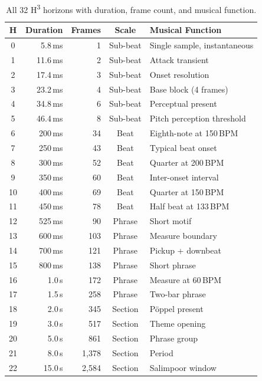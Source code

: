 \documentclass[10pt,twocolumn]{article}
\newcommand{\Htri}{H\textsuperscript{3}}
\begin{document}
\begin{table}[H]
\centering
\caption{All 32 \Htri{} horizons with duration, frame count, and musical function.}
\small
\begin{tabular}{@{}crrcl@{}}
\toprule
\textbf{H} & \textbf{Duration} & \textbf{Frames} & \textbf{Scale} & \textbf{Musical Function} \\
\midrule
0  & 5.8\,ms   & 1     & Sub-beat & Single sample, instantaneous \\
1  & 11.6\,ms  & 2     & Sub-beat & Attack transient \\
2  & 17.4\,ms  & 3     & Sub-beat & Onset resolution \\
3  & 23.2\,ms  & 4     & Sub-beat & Base block (4 frames) \\
4  & 34.8\,ms  & 6     & Sub-beat & Perceptual present \\
5  & 46.4\,ms  & 8     & Sub-beat & Pitch perception threshold \\
\midrule
6  & 200\,ms   & 34    & Beat & Eighth-note at 150\,BPM \\
7  & 250\,ms   & 43    & Beat & Typical beat onset \\
8  & 300\,ms   & 52    & Beat & Quarter at 200\,BPM \\
9  & 350\,ms   & 60    & Beat & Inter-onset interval \\
10 & 400\,ms   & 69    & Beat & Quarter at 150\,BPM \\
11 & 450\,ms   & 78    & Beat & Half beat at 133\,BPM \\
\midrule
12 & 525\,ms   & 90    & Phrase & Short motif \\
13 & 600\,ms   & 103   & Phrase & Measure boundary \\
14 & 700\,ms   & 121   & Phrase & Pickup + downbeat \\
15 & 800\,ms   & 138   & Phrase & Short phrase \\
16 & 1.0\,s    & 172   & Phrase & Measure at 60\,BPM \\
17 & 1.5\,s    & 258   & Phrase & Two-bar phrase \\
\midrule
18 & 2.0\,s    & 345   & Section & P\"{o}ppel present \\
19 & 3.0\,s    & 517   & Section & Theme opening \\
20 & 5.0\,s    & 861   & Section & Phrase group \\
21 & 8.0\,s    & 1,378 & Section & Period \\
22 & 15.0\,s   & 2,584 & Section & Salimpoor window \\

\end{tabular}
\end{table}
\end{document}
